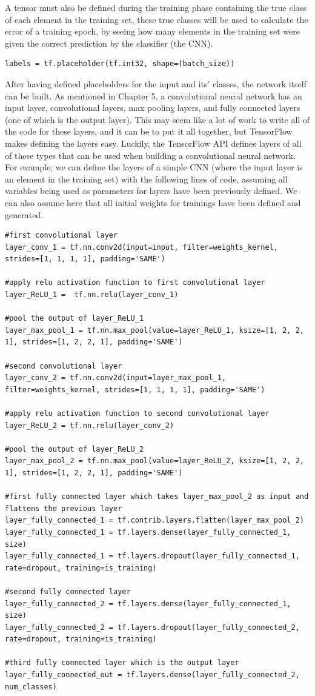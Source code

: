 \documentclass[12pt]{report} %
\begin{document}
	A tensor must also be defined during the training phase containing the true class of each element in the training set, these true classes will be used to calculate the error of a training epoch, by seeing how many elements in the training set were given the correct prediction by the classifier (the CNN).
\begin{verbatim}
labels = tf.placeholder(tf.int32, shape=(batch_size))
\end{verbatim}
	
	After having defined placeholders for the input and its' classes, the network itself can be built. As mentioned in Chapter 5, a convolutional neural network has an input layer, convolutional layers, max pooling layers, and fully connected layers (one of which is the output layer). This may seem like a lot of work to write all of the code for these layers, and it can be to put it all together, but TensorFlow makes defining the layers easy. Luckily, the TensorFlow API defines layers of all of these types that can be used when building a convolutional neural network. For example, we can define the layers of a simple CNN (where the input layer is an element in the training set) with the following lines of code, assuming all variables being used as parameters for layers have been previously defined. We can also assume here that all initial weights for trainings have been defined and generated.
	
\begin{verbatim}
#first convolutional layer
layer_conv_1 = tf.nn.conv2d(input=input, filter=weights_kernel, strides=[1, 1, 1, 1], padding='SAME')

#apply relu activation function to first convolutional layer
layer_ReLU_1 =  tf.nn.relu(layer_conv_1)

#pool the output of layer_ReLU_1
layer_max_pool_1 = tf.nn.max_pool(value=layer_ReLU_1, ksize=[1, 2, 2, 1], strides=[1, 2, 2, 1], padding='SAME')

#second convolutional layer
layer_conv_2 = tf.nn.conv2d(input=layer_max_pool_1, filter=weights_kernel, strides=[1, 1, 1, 1], padding='SAME')

#apply relu activation function to second convolutional layer
layer_ReLU_2 = tf.nn.relu(layer_conv_2)

#pool the output of layer_ReLU_2
layer_max_pool_2 = tf.nn.max_pool(value=layer_ReLU_2, ksize=[1, 2, 2, 1], strides=[1, 2, 2, 1], padding='SAME')

#first fully connected layer which takes layer_max_pool_2 as input and flattens the previous layer
layer_fully_connected_1 = tf.contrib.layers.flatten(layer_max_pool_2)
layer_fully_connected_1 = tf.layers.dense(layer_fully_connected_1, size)
layer_fully_connected_1 = tf.layers.dropout(layer_fully_connected_1, rate=dropout, training=is_training)

#second fully connected layer
layer_fully_connected_2 = tf.layers.dense(layer_fully_connected_1, size)
layer_fully_connected_2 = tf.layers.dropout(layer_fully_connected_2, rate=dropout, training=is_training)

#third fully connected layer which is the output layer
layer_fully_connected_out = tf.layers.dense(layer_fully_connected_2, num_classes)
\end{verbatim}
\end{document}

